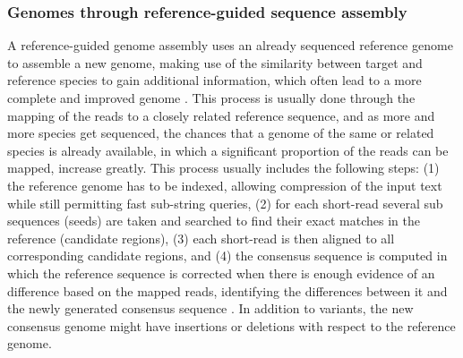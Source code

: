 \begin{table}[h!]
\caption{The standard filename extension for a text file containing FASTA formatted sequences.}
\label{tab:fasta_extension}
\end{table}

\subsubsection{Genomes through reference-guided sequence assembly}

A reference-guided genome assembly uses an already sequenced reference genome to assemble a new genome, making use of the similarity between target and reference species to gain additional information, which often lead to a more complete and improved genome \citep{rausch_consistency-based_2009, lischer_reference-guided_2017}. 
This process is usually done through the mapping of the reads to a closely related reference sequence, and as more and more species get sequenced, the chances that a genome of the same or related species is already available, in which a significant proportion of the reads can be mapped, increase greatly. 
This process usually includes the following steps: (1) the reference genome has to be indexed, allowing compression of the input text while still permitting fast sub-string queries, (2) for each short-read several sub sequences (seeds) are taken and searched to find their exact matches in the reference  (candidate regions), (3) each short-read is then aligned to all corresponding candidate regions, and (4) the consensus sequence is computed in which the reference sequence is corrected when there is enough evidence of an difference based on the mapped
reads, identifying the differences between it and the newly generated consensus sequence \citep{bayat_methods_2020}.
In addition to variants, the new consensus genome might have insertions or deletions with respect to the reference genome.

